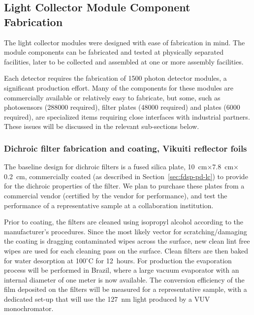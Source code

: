 \subsection{Light Collector Module Component Fabrication}

The  light collector modules were designed with ease of fabrication in mind.  The module components can be fabricated and  tested at physically separated facilities, later to be collected and assembled at one or more assembly facilities.  %


Each  detector requires the fabrication of \num{1500} photon detector modules, a significant production effort.  Many of the components for these modules are commercially available or relatively easy to fabricate, but some, such as photosensors (\num{288000} required), filter plates (\num{48000} required) and  plates (\num{6000} required), are specialized items requiring close interfaces with industrial partners.  These issues will be discussed in the relevant sub-sections below.   

\subsubsection{Dichroic filter fabrication and coating, Vikuiti reflector foils}


The baseline design for dichroic filters is 
a fused silica plate,  \SI{10}{cm}$\times$\SI{7.8}{cm}$\times$\SI{0.2}{cm}, commercially coated (as described in Section~\ref{sec:fdsp-pd-lc}) to provide for the dichroic properties of the filter.  
We plan to purchase these plates from a commercial vendor (certified by the vendor for performance), and test the performance of a representative sample at a collaboration institution.  

Prior to coating, the filters are cleaned using isopropyl alcohol according to the manufacturer's procedures. %
Since the most likely vector for scratching/damaging the coating is dragging contaminated wipes across the surface, new clean lint free wipes are used for each cleaning pass on the surface. Clean filters are then baked for water desorption at 100$^\circ$C for \SI{12}{hours}. 
For   production the evaporation process will be performed
in Brazil, 
where a large vacuum evaporator with an internal diameter of one meter is now available. The conversion efficiency of the film deposited on the filters will be measured for a representative sample, with a dedicated set-up that will use the \SI{127}{nm} light produced by a VUV monochromator.

